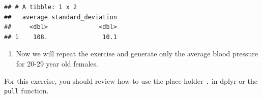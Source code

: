 \documentclass[
]{article}
\newenvironment{Shaded}{\begin{snugshade}}{\end{snugshade}}
\newcommand{\CommentTok}[1]{\textcolor[rgb]{0.56,0.35,0.01}{\textit{#1}}}
\newcommand{\DataTypeTok}[1]{\textcolor[rgb]{0.13,0.29,0.53}{#1}}
\newcommand{\KeywordTok}[1]{\textcolor[rgb]{0.13,0.29,0.53}{\textbf{#1}}}
\newcommand{\NormalTok}[1]{#1}
\newcommand{\OperatorTok}[1]{\textcolor[rgb]{0.81,0.36,0.00}{\textbf{#1}}}
\newcommand{\OtherTok}[1]{\textcolor[rgb]{0.56,0.35,0.01}{#1}}
\newcommand{\StringTok}[1]{\textcolor[rgb]{0.31,0.60,0.02}{#1}}
\providecommand{\tightlist}{%
  \setlength{\itemsep}{0pt}\setlength{\parskip}{0pt}}
\begin{document}
\begin{Shaded}
\end{Shaded}

\begin{verbatim}
## # A tibble: 1 x 2
##   average standard_deviation
##     <dbl>              <dbl>
## 1    108.               10.1
\end{verbatim}

\begin{enumerate}
\def\labelenumi{\arabic{enumi}.}
\setcounter{enumi}{2}
\tightlist
\item
  Now we will repeat the exercise and generate only the average blood
  pressure for 20-29 year old females.
\end{enumerate}

For this exercise, you should review how to use the place holder
\texttt{.} in dplyr or the \texttt{pull} function.

\begin{Shaded}
\end{Shaded}
\end{document}

